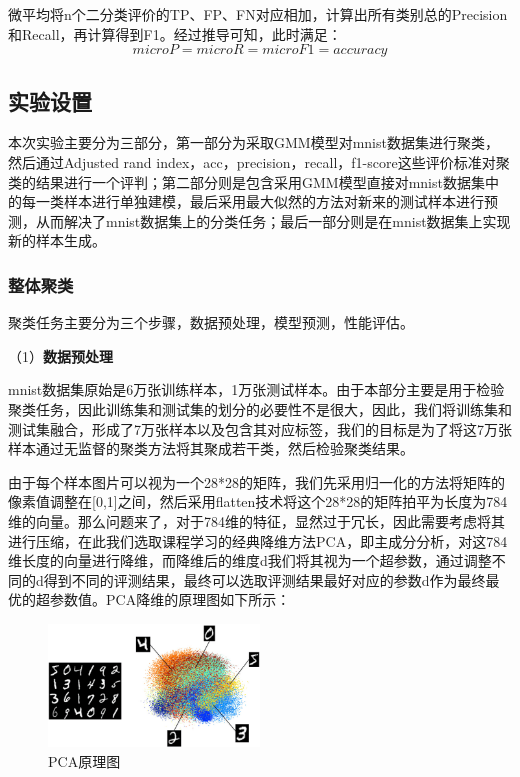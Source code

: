 \documentclass[UTF8]{ctexart}
\begin{document}
微平均将n个二分类评价的TP、FP、FN对应相加，计算出所有类别总的Precision和Recall，再计算得到F1。经过推导可知，此时满足：
\begin{equation}
	microP=microR=microF1=accuracy
\end{equation}

\subsection{实验设置}
本次实验主要分为三部分，第一部分为采取GMM模型对mnist数据集进行聚类，然后通过Adjusted rand index，acc，precision，recall，f1-score这些评价标准对聚类的结果进行一个评判；第二部分则是包含采用GMM模型直接对mnist数据集中的每一类样本进行单独建模，最后采用最大似然的方法对新来的测试样本进行预测，从而解决了mnist数据集上的分类任务；最后一部分则是在mnist数据集上实现新的样本生成。

\subsubsection{整体聚类}

聚类任务主要分为三个步骤，数据预处理，模型预测，性能评估。

（1）\textbf{数据预处理}

mnist数据集原始是6万张训练样本，1万张测试样本。由于本部分主要是用于检验聚类任务，因此训练集和测试集的划分的必要性不是很大，因此，我们将训练集和测试集融合，形成了7万张样本以及包含其对应标签，我们的目标是为了将这7万张样本通过无监督的聚类方法将其聚成若干类，然后检验聚类结果。

由于每个样本图片可以视为一个28*28的矩阵，我们先采用归一化的方法将矩阵的像素值调整在[0,1]之间，然后采用flatten技术将这个28*28的矩阵拍平为长度为784维的向量。那么问题来了，对于784维的特征，显然过于冗长，因此需要考虑将其进行压缩，在此我们选取课程学习的经典降维方法PCA，即主成分分析，对这784维长度的向量进行降维，而降维后的维度d我们将其视为一个超参数，通过调整不同的d得到不同的评测结果，最终可以选取评测结果最好对应的参数d作为最终最优的超参数值。PCA降维的原理图如下所示：

\begin{figure}[!h]
  \includegraphics[width=0.5\textwidth]{./figures/PCA_mnist.png}
  \centering
  \caption{PCA原理图}
  \label{PCA-model}
\end{figure}
\end{document}
